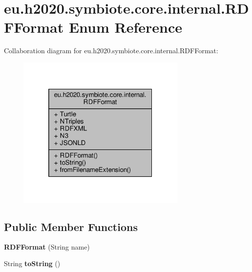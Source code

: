 \hypertarget{enumeu_1_1h2020_1_1symbiote_1_1core_1_1internal_1_1RDFFormat}{}\section{eu.\+h2020.\+symbiote.\+core.\+internal.\+R\+D\+F\+Format Enum Reference}
\label{enumeu_1_1h2020_1_1symbiote_1_1core_1_1internal_1_1RDFFormat}


Collaboration diagram for eu.\+h2020.\+symbiote.\+core.\+internal.\+R\+D\+F\+Format\+:
\nopagebreak
\begin{figure}[H]
\begin{center}
\leavevmode
\includegraphics[width=236pt]{enumeu_1_1h2020_1_1symbiote_1_1core_1_1internal_1_1RDFFormat__coll__graph}
\end{center}
\end{figure}
\subsection*{Public Member Functions}
\begin{DoxyCompactItemize}
\item 
\mbox{\label{enumeu_1_1h2020_1_1symbiote_1_1core_1_1internal_1_1RDFFormat_a0ac49ed0bfd1fbee1e68d38f22ad47d5}} 
{\bfseries R\+D\+F\+Format} (String name)
\item 
\mbox{\label{enumeu_1_1h2020_1_1symbiote_1_1core_1_1internal_1_1RDFFormat_af9f3124bc9ed44a85e6846ff5bb0d955}} 
String {\bfseries to\+String} ()
\end{DoxyCompactItemize}
